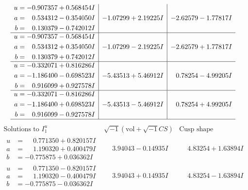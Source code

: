\documentclass[1p]{elsarticle_modified}
\theoremstyle{definition}
\newcommand{\I}{\sqrt{-1}}
\begin{document}
$$\begin{array}{c|c|c}
\begin{aligned}
u &= -0.907357 + 0.568454 I \\
a &= \phantom{-}0.534312 - 0.354050 I \\
b &= \phantom{-}0.130379 - 0.742012 I\end{aligned}
 & -1.07299 + 2.19225 I & -2.62579 - 1.77817 I \\ \hline\begin{aligned}
u &= -0.907357 - 0.568454 I \\
a &= \phantom{-}0.534312 + 0.354050 I \\
b &= \phantom{-}0.130379 + 0.742012 I\end{aligned}
 & -1.07299 - 2.19225 I & -2.62579 + 1.77817 I \\ \hline\begin{aligned}
u &= -0.332071 + 0.816286 I \\
a &= -1.186400 - 0.698523 I \\
b &= \phantom{-}0.916099 + 0.927578 I\end{aligned}
 & -5.43513 + 5.46912 I & \phantom{-}0.78254 - 4.99205 I \\ \hline\begin{aligned}
u &= -0.332071 - 0.816286 I \\
a &= -1.186400 + 0.698523 I \\
b &= \phantom{-}0.916099 - 0.927578 I\end{aligned}
 & -5.43513 - 5.46912 I & \phantom{-}0.78254 + 4.99205 I\\
 \hline 
 \end{array}$$\newpage$$\begin{array}{c|c|c}  
\text{Solutions to }I^u_{1}& \I (\text{vol} + \sqrt{-1}CS) & \text{Cusp shape}\\
 \hline 
\begin{aligned}
u &= \phantom{-}0.771350 + 0.820157 I \\
a &= \phantom{-}1.190320 + 0.400479 I \\
b &= -0.775875 + 0.036362 I\end{aligned}
 & \phantom{-}3.94043 - 0.14935 I & \phantom{-}4.83254 + 1.63894 I \\ \hline\begin{aligned}
u &= \phantom{-}0.771350 - 0.820157 I \\
a &= \phantom{-}1.190320 - 0.400479 I \\
b &= -0.775875 - 0.036362 I\end{aligned}
 & \phantom{-}3.94043 + 0.14935 I & \phantom{-}4.83254 - 1.63894 I \\ \hline\begin{aligned}

\end{aligned}
\end{array}$$
\end{document}
